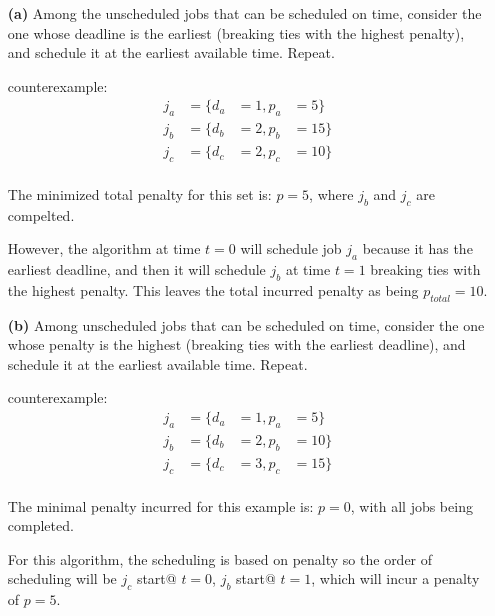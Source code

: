 \documentclass[11pt]{article}
\begin{document}
\begin{itemize}
 
\item[{\bf (a)}] Among the unscheduled jobs that can be scheduled on time, consider the
one whose deadline is the earliest (breaking ties with the highest penalty), and schedule 
it at the earliest available time. Repeat.

counterexample: 
\begin{equation*}
  \begin{align}
    j_a&=\{d_a&=1,p_a&=5\}\\
    j_b&=\{d_b&=2,p_b&=15\}\\
    j_c&=\{d_c&=2,p_c&=10\}\\
  \end{align}
\end{equation*}

The minimized total penalty for this set is: $p=5$, where $j_b$ and $j_c$ are compelted. 

However, the algorithm at time $t=0$ will schedule job $j_a$ because it has the earliest
deadline, and then it will schedule $j_b$ at time $t=1$ breaking ties with the highest
penalty. This leaves the total incurred penalty as being $p_{total}=10$.

\item[{\bf (b)}] Among unscheduled jobs that can be scheduled on time, consider the one
 whose penalty is the highest (breaking ties with the earliest deadline), and schedule
 it at the earliest available time. Repeat.

counterexample: 
\begin{equation*}
  \begin{align}
    j_a&=\{d_a&=1,p_a&=5\}\\
    j_b&=\{d_b&=2,p_b&=10\}\\
    j_c&=\{d_c&=3,p_c&=15\}\\
  \end{align}
\end{equation*}

The minimal penalty incurred for this example is: $p=0$, with all jobs being completed.

For this algorithm, the scheduling is based on penalty so the order of scheduling will be
$j_c$ start@ $t=0$, $j_b$ start@ $t=1$, which will incur a penalty of $p=5$.

\end{itemize}

\label{pg:end-of-p3}

%
\end{document}
